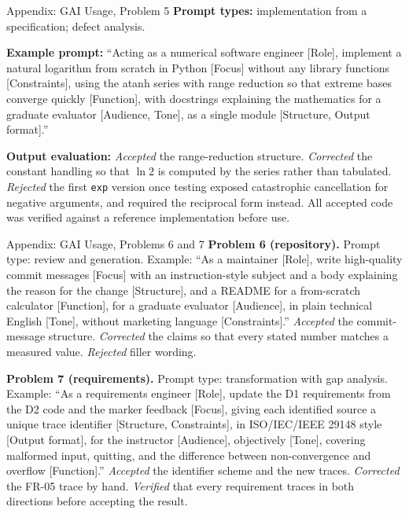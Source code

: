 \documentclass[11pt]{beamer}
\begin{document}
\begin{frame}{Appendix: GAI Usage, Problem 5}
  \textbf{Prompt types:} implementation from a specification; defect analysis.
  \medskip

  \textbf{Example prompt:} ``Acting as a numerical software engineer [Role],
  implement a natural logarithm from scratch in Python [Focus] without any
  library functions [Constraints], using the atanh series with range
  reduction so that extreme bases converge quickly [Function], with
  docstrings explaining the mathematics for a graduate evaluator
  [Audience, Tone], as a single module [Structure, Output format].''
  \medskip

  \textbf{Output evaluation:} \emph{Accepted} the range-reduction structure.
  \emph{Corrected} the constant handling so that $\ln 2$ is computed by the
  series rather than tabulated. \emph{Rejected} the first \texttt{exp}
  version once testing exposed catastrophic cancellation for negative
  arguments, and required the reciprocal form instead. All accepted code was
  verified against a reference implementation before use.
\end{frame}

\begin{frame}{Appendix: GAI Usage, Problems 6 and 7}
  \small
  \textbf{Problem 6 (repository).} Prompt type: review and generation.
  Example: ``As a maintainer [Role], write high-quality commit messages
  [Focus] with an instruction-style subject and a body explaining the reason
  for the change [Structure], and a README for a from-scratch calculator
  [Function], for a graduate evaluator [Audience], in plain technical English
  [Tone], without marketing language [Constraints].''
  \emph{Accepted} the commit-message structure. \emph{Corrected} the claims so
  that every stated number matches a measured value. \emph{Rejected} filler
  wording.
  \medskip

  \textbf{Problem 7 (requirements).} Prompt type: transformation with gap
  analysis. Example: ``As a requirements engineer [Role], update the D1
  requirements from the D2 code and the marker feedback [Focus], giving each
  identified source a unique trace identifier [Structure, Constraints], in
  ISO/IEC/IEEE 29148 style [Output format], for the instructor [Audience],
  objectively [Tone], covering malformed input, quitting, and the difference
  between non-convergence and overflow [Function].''
  \emph{Accepted} the identifier scheme and the new traces. \emph{Corrected}
  the FR-05 trace by hand. \emph{Verified} that every requirement traces in
  both directions before accepting the result.
\end{frame}
\end{document}
